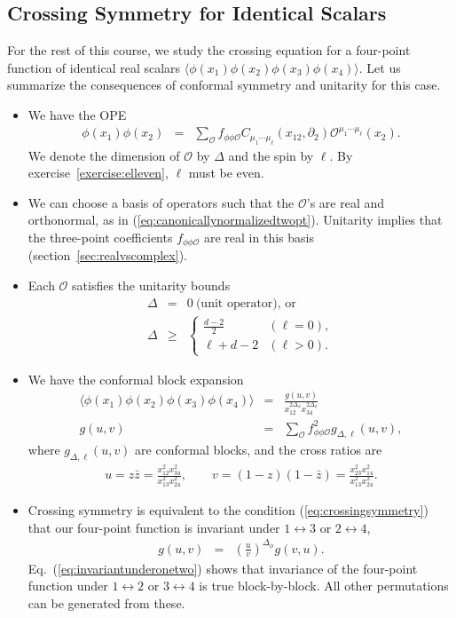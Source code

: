 \documentclass[11pt]{ws-rv9x6}
\newcommand\be{\begin{eqnarray}}
\newcommand\ee{\end{eqnarray}}
\newcommand\f\phi
\newcommand\cO{\mathcal{O}}
\newcommand\p[1]{\left(#1\right)}
\newcommand\ptl\partial
\newcommand\<\langle
\renewcommand\>\rangle
\newcommand\nn{\nonumber}
\renewcommand\.{\cdot}
\newcommand\De{\Delta}
\begin{document}
\subsection{Crossing Symmetry for Identical Scalars} 

For the rest of this course, we study the crossing equation for a four-point function of identical real scalars $\<\f(x_1)\f(x_2)\f(x_3)\f(x_4)\>$.  Let us summarize the consequences of conformal symmetry and unitarity for this case.
\begin{itemize}
\item We have the OPE
\be
\f(x_1)\f(x_2) &=& \sum_{\cO} f_{\f\f\cO} C_{\mu_1\cdots\mu_\ell}(x_{12},\ptl_2) \cO^{\mu_1\cdots\mu_\ell}(x_2).
\ee
We denote the dimension of $\cO$ by $\De$ and the spin by $\ell$. By exercise~\ref{exercise:elleven}, $\ell$ must be even.

\item We can choose a basis of operators such that the $\cO$'s are real and orthonormal, as in  (\ref{eq:canonicallynormalizedtwopt}).  Unitarity implies that the three-point coefficients $f_{\f\f\cO}$ are real in this basis (section~\ref{sec:realvscomplex}).

\item Each $\cO$ satisfies the unitarity bounds
\be
\label{eq:unitarityboundsummary}
\De &=& 0 \ \textrm{(unit operator), or}\nn\\
\De &\geq& \left\{
\begin{array}{ll}
\frac{d-2}{2} & (\ell=0),\\
\ell+d-2 & (\ell > 0).
\end{array}
\right.
\ee

\item We have the conformal block expansion
\be
\<\f(x_1)\f(x_2)\f(x_3)\f(x_4)\> &=& \frac{g(u,v)}{x_{12}^{2\De_\f}x_{34}^{2\De_\f}}\\
g(u,v) &=& \sum_\cO f_{\f\f\cO}^2 g_{\De,\ell}(u,v),
\ee
where $g_{\De,\ell}(u,v)$ are conformal blocks, and the cross ratios are
\be
u = z\bar z = \frac{x_{12}^2 x_{34}^2}{x_{13}^2 x_{24}^2},\qquad v=(1-z)(1-\bar z) =\frac{x_{23}^2 x_{14}^2}{x_{13}^2 x_{24}^2}.
\ee


\item Crossing symmetry is equivalent to the condition (\ref{eq:crossingsymmetry}) that our four-point function is invariant under $1\leftrightarrow 3$ or $2\leftrightarrow 4$,
\be
\label{eq:crossingeqsummary}
g(u,v) &=& \p{\frac{u}{v}}^{\De_\f} g(v,u).
\ee
Eq.~(\ref{eq:invariantunderonetwo}) shows that invariance of the four-point function under $1\leftrightarrow 2$ or $3\leftrightarrow 4$ is true block-by-block.  All other permutations can be generated from these.

\end{itemize}
\end{document}
